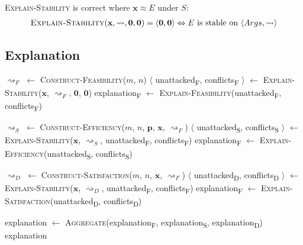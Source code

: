 \begin{theorem}
	\textsc{Explain-Stability} is correct where $\mathbf{x}\approx E$ under $S$:
	\begin{align*}
		\textsc{Explain-Stability}(\mathbf{x},\rightsquigarrow,\mathbf{0},\mathbf{0})=\langle \mathbf{0},\mathbf{0}\rangle\Leftrightarrow E\text{ is stable on }\langle Args, \rightsquigarrow\rangle
	\end{align*}
\end{theorem}
	
\subsection{Explanation}

\begin{algorithm}[h!]
	\begin{algorithmic}[1]
				\State $\rightsquigarrow_F$ $\gets$ \textsc{Construct-Feasibility}($m$, $n$)
				\State $\langle$ unattacked\textsubscript{F}, conflicts\textsubscript{F} $\rangle$ $\gets$ \textsc{Explain-Stability}($\mathbf{x}$, $\rightsquigarrow_F$, $\mathbf{0}$, $\mathbf{0}$)
				\State explanation\textsubscript{F} $\gets$ \textsc{Explain-Feasibility}(unattacked\textsubscript{F}, conflicts\textsubscript{F})

				\State $\rightsquigarrow_S$ $\gets$ \textsc{Construct-Efficiency}($m$, $n$, $\mathbf{p}$, $\mathbf{x}$, $\rightsquigarrow_F$)
				\State $\langle$ unattacked\textsubscript{S}, conflicts\textsubscript{S} $\rangle$ $\gets$ \textsc{Explain-Stability}($\mathbf{x}$, $\rightsquigarrow_S$, unattacked\textsubscript{F}, conflicts\textsubscript{F})
				\State explanation\textsubscript{F} $\gets$ \textsc{Explain-Efficiency}(unattacked\textsubscript{S}, conflicts\textsubscript{S})

				\State $\rightsquigarrow_D$ $\gets$ \textsc{Construct-Satisfaction}($m$, $n$, $\mathbf{x}$, $\rightsquigarrow_F$)
				\State $\langle$ unattacked\textsubscript{D}, conflicts\textsubscript{D} $\rangle$ $\gets$ \textsc{Explain-Stability}($\mathbf{x}$, $\rightsquigarrow_D$, unattacked\textsubscript{F}, conflicts\textsubscript{F})
				\State explanation\textsubscript{F} $\gets$ \textsc{Explain-Satisfaction}(unattacked\textsubscript{D}, conflicts\textsubscript{D})
				
				\State explanation $\gets$ \textsc{Aggregate}(explanation\textsubscript{F}, explanation\textsubscript{S}, explanation\textsubscript{D})
				\State \Return explanation
		\EndFunction
	\end{algorithmic}
\end{algorithm}
